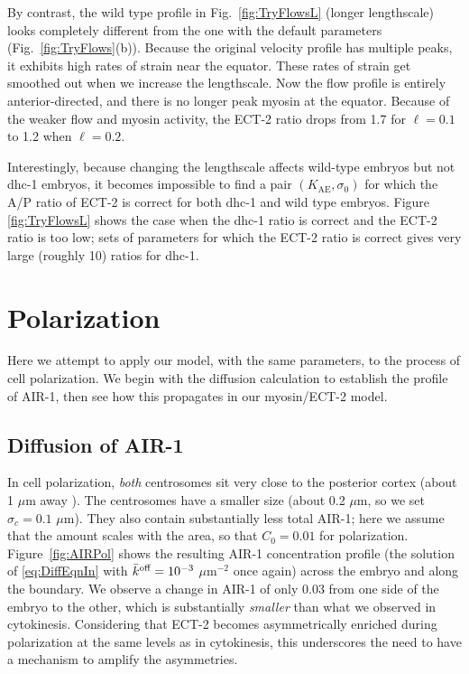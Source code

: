 \documentclass[11pt]{article}
\begin{document}
By contrast, the wild type profile in Fig.\ \ref{fig:TryFlowsL} (longer lengthscale) looks completely different from the one with the default parameters (Fig.\ \ref{fig:TryFlows}(b)). Because the original velocity profile has multiple peaks, it exhibits high rates of strain near the equator. These rates of strain get smoothed out when we increase the lengthscale. Now the flow profile is entirely anterior-directed, and there is no longer peak myosin at the equator. Because of the weaker flow and myosin activity, the ECT-2 ratio drops from 1.7 for $\ell=0.1$ to 1.2 when $\ell=0.2$. 

Interestingly, because changing the lengthscale affects wild-type embryos but not dhc-1 embryos, it becomes impossible to find a pair $\left(K_\text{AE}, \sigma_0\right)$ for which the A/P ratio of ECT-2 is correct for both dhc-1 and wild type embryos. Figure \ref{fig:TryFlowsL} shows the case when the dhc-1 ratio is correct and the ECT-2 ratio is too low; sets of parameters for which the ECT-2 ratio is correct gives very large (roughly 10) ratios for dhc-1. 

\section{Polarization}
Here we attempt to apply our model, with the same parameters, to the process of cell polarization. We begin with the diffusion calculation to establish the profile of AIR-1, then see how this propagates in our myosin/ECT-2 model.

\subsection{Diffusion of AIR-1 \label{sec:airpol}}
In cell polarization, \emph{both} centrosomes sit very close to the posterior cortex (about 1 $\mu$m away \cite{cowan2004centrosomes}). The centrosomes have a smaller size (about 0.2 $\mu$m, so we set $\sigma_c=0.1$ $\mu$m). They also contain substantially less total AIR-1; here we assume that the amount scales with the area, so that $C_0=0.01$ for polarization. Figure\ \ref{fig:AIRPol} shows the resulting AIR-1 concentration profile (the solution of \eqref{eq:DiffEqnIn} with $\bar{k}^\text{off}=10^{-3}$ $\mu$m$^{-2}$ once again) across the embryo and along the boundary. We observe a change in AIR-1 of only 0.03 from one side of the embryo to the other, which is substantially \emph{smaller} than what we observed in cytokinesis. Considering that ECT-2 becomes asymmetrically enriched during polarization at the same levels as in cytokinesis, this underscores the need to have a mechanism to amplify the asymmetries. 
\end{document}
